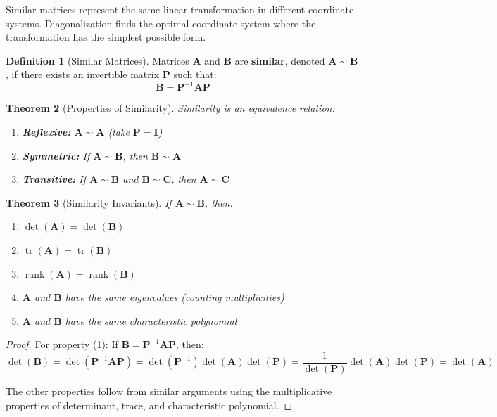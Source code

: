 \documentclass[12pt]{article}
\numberwithin{equation}{section}
\newcommand{\mat}[1]{\mathbf{#1}}        %
\newcommand{\rank}{\operatorname{rank}}
\newcommand{\tr}{\operatorname{tr}}
\theoremstyle{plain}
\newtheorem{theorem}{Theorem}[section]
\theoremstyle{definition}
\newtheorem{definition}[theorem]{Definition}
\theoremstyle{remark}
\begin{document}
Similar matrices represent the same linear transformation in different coordinate systems. Diagonalization finds the optimal coordinate system where the transformation has the simplest possible form.

\begin{definition}[Similar Matrices]
Matrices $\mat{A}$ and $\mat{B}$ are \textbf{similar}, denoted $\mat{A} \sim \mat{B}$, if there exists an invertible matrix $\mat{P}$ such that:
$$\mat{B} = \mat{P}^{-1}\mat{A}\mat{P}$$
\end{definition}

\begin{theorem}[Properties of Similarity]
Similarity is an equivalence relation:
\begin{enumerate}
\item \textbf{Reflexive:} $\mat{A} \sim \mat{A}$ (take $\mat{P} = \mat{I}$)
\item \textbf{Symmetric:} If $\mat{A} \sim \mat{B}$, then $\mat{B} \sim \mat{A}$
\item \textbf{Transitive:} If $\mat{A} \sim \mat{B}$ and $\mat{B} \sim \mat{C}$, then $\mat{A} \sim \mat{C}$
\end{enumerate}
\end{theorem}

\begin{theorem}[Similarity Invariants]
If $\mat{A} \sim \mat{B}$, then:
\begin{enumerate}
\item $\det(\mat{A}) = \det(\mat{B})$
\item $\tr(\mat{A}) = \tr(\mat{B})$
\item $\rank(\mat{A}) = \rank(\mat{B})$
\item $\mat{A}$ and $\mat{B}$ have the same eigenvalues (counting multiplicities)
\item $\mat{A}$ and $\mat{B}$ have the same characteristic polynomial
\end{enumerate}
\end{theorem}

\begin{proof}
For property (1): If $\mat{B} = \mat{P}^{-1}\mat{A}\mat{P}$, then:
$$\det(\mat{B}) = \det(\mat{P}^{-1}\mat{A}\mat{P}) = \det(\mat{P}^{-1})\det(\mat{A})\det(\mat{P}) = \frac{1}{\det(\mat{P})}\det(\mat{A})\det(\mat{P}) = \det(\mat{A})$$

The other properties follow from similar arguments using the multiplicative properties of determinant, trace, and characteristic polynomial.
\end{proof}
\end{document}

